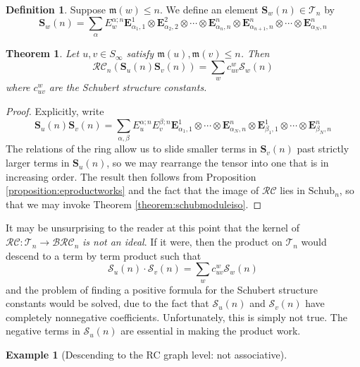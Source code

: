 \documentclass{amsart}
\newtheorem{theorem}{Theorem}[section]
\theoremstyle{definition}
\newtheorem{definition}[lemma]{Definition}
\newtheorem{example}[lemma]{Example}
\theoremstyle{remark}
\numberwithin{equation}{subsection}
\newcommand{\BRC}{\mathcal{BRC}}
\newcommand{\RC}{\mathcal{RC}}
\newcommand{\maxd}{\mathfrak{m}}
\begin{document}

\begin{definition}
  Suppose $\maxd(w)\leq n$. We define an element $\mathbf{S}_w(n)\in \mathcal{T}_n$ by
  $$\mathbf{S}_w(n) = \sum_{\alpha} E_w^{\alpha;n}\mathbf{E}_{\alpha_1,1}^1\otimes \mathbf{E}_{\alpha_2,2}^2\otimes \cdots \otimes \mathbf{E}_{\alpha_n,n}^n\otimes \mathbf{E}_{\alpha_{n+1}, n}^n\otimes\cdots \otimes \mathbf{E}_{\alpha_N,n}^n$$
\end{definition}

\begin{theorem} \label{theorem:schubproduct}
Let $u,v\in S_\infty$ satisfy $\maxd(u),\maxd(v)\leq n$. Then
$$\RC_n(\mathbf{S}_u(n)\mathbf{S}_v(n)) = \sum_{w} c_{uv}^w \mathcal{S}_w(n)$$
where $c_{uv}^w$ are the Schubert structure constants.
\end{theorem}
\begin{proof}
  Explicitly, write
  $$\mathbf{S}_u(n)\mathbf{S}_v(n) = \sum_{\alpha,\beta} E_u^{\alpha;n}E_v^{\beta;n} \mathbf{E}_{\alpha_1,1}^1\otimes \cdots \otimes \mathbf{E}_{\alpha_N,n}^n\otimes \mathbf{E}_{\beta_1,1}^1\otimes \cdots \otimes \mathbf{E}_{\beta_N,n}^n$$
  The relations of the ring allow us to slide smaller terms in $\mathbf{S}_v(n)$ past strictly larger terms in $\mathbf{S}_u(n)$, so we may rearrange the tensor into one that is in increasing order. The result then follows from Proposition \ref{proposition:eproductworks} and the fact that the image of $\RC$ lies in $\mathrm{Schub}_n$, so that we may invoke Theorem \ref{theorem:schubmoduleiso}.
\end{proof}

It may be unsurprising to the reader at this point that the kernel of $\RC:\mathcal{T}_n\to \BRC_n$ \emph{is not an ideal}. If it were, then the product on $\mathcal{T}_n$ would descend to a term by term product such that
$$\mathcal{S}_u(n)\cdot \mathcal{S}_v(n) = \sum_{w} c_{uv}^w \mathcal{S}_w(n)$$
and the problem of finding a positive formula for the Schubert structure constants would be solved, due to the fact that $\mathcal{S}_u(n)$ and $\mathcal{S}_v(n)$ have completely nonnegative coefficients. Unfortunately, this is simply not true. The negative terms in $\mathcal{S}_u(n)$ are essential in making the product work.

\begin{example}[Descending to the RC graph level: not associative]

\end{example}
\end{document}
